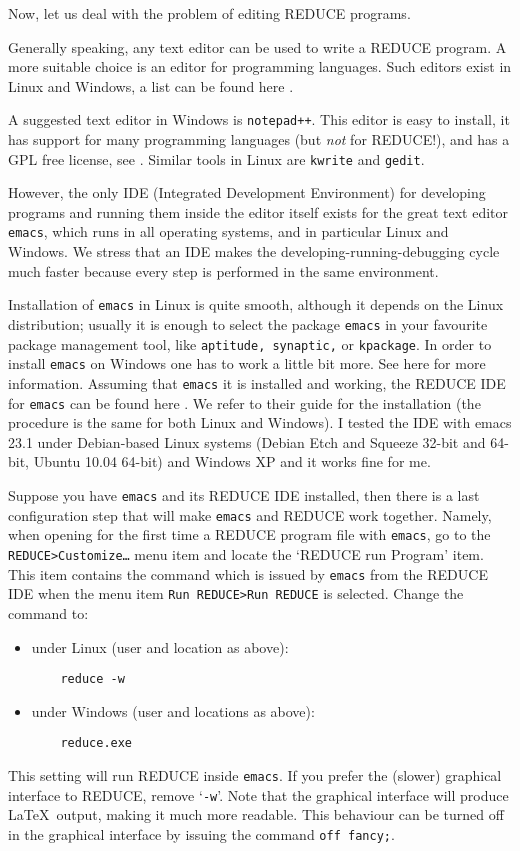 \documentclass[12pt]{amsart}
\theoremstyle{definition}
\newcommand{\reduce}{REDUCE\xspace}
\begin{document}
Now, let us deal with the problem of editing \reduce programs.

Generally speaking, any text editor can be used to write a \reduce program. A
more suitable choice is an editor for programming languages. Such editors exist
in Linux and Windows, a list can be found here \cite{ed}.

A suggested text editor in Windows is \texttt{notepad++}. This editor is easy
to install, it has support for many programming languages (but \emph{not} for
\reduce!), and has a GPL free license, see \cite{noteppp}. Similar tools in
Linux are \texttt{kwrite} and \texttt{gedit}.

However, the only IDE (Integrated Development Environment) for developing
programs and running them inside the editor itself exists for the great text
editor \texttt{emacs}, which runs in all operating systems, and in particular
Linux and Windows. We stress that an IDE makes the developing-running-debugging
cycle much faster because every step is performed in the same environment.

Installation of \texttt{emacs} in Linux is quite smooth, although it depends on
the Linux distribution; usually it is enough to select the package
\texttt{emacs} in your favourite package management tool, like
\texttt{aptitude, synaptic,} or \texttt{kpackage}.  In order to install
\texttt{emacs} on Windows one has to work a little bit more. See here
\cite{emacswin} for more information.  Assuming that \texttt{emacs} it is
installed and working, the \reduce IDE for \texttt{emacs} can be found here
\cite{redide}.  We refer to their guide for the installation (the procedure is
the same for both Linux and Windows). I tested the IDE with emacs 23.1 under
Debian-based Linux systems (Debian Etch and Squeeze 32-bit and 64-bit, Ubuntu
10.04 64-bit) and Windows XP and it works fine for me.

Suppose you have \texttt{emacs} and its \reduce IDE installed, then there is a
last configuration step that will make \texttt{emacs} and \reduce work together.
Namely, when opening for the first time a \reduce program file with
\texttt{emacs}, go to the \texttt{REDUCE>Customize\dots} menu item and locate
the `\reduce run Program' item. This item contains the command which is issued
by \texttt{emacs} from the \reduce IDE when the menu item \texttt{Run REDUCE>Run
  REDUCE} is selected. Change the command to:
  \begin{itemize}
  \item under Linux (user and location as above):
   \begin{verbatim}
    reduce -w
    \end{verbatim}
  \item under Windows (user and locations as above):
   \begin{verbatim}
    reduce.exe
    \end{verbatim}
  \end{itemize}
This setting will run \reduce inside \texttt{emacs}. If you prefer the (slower)
graphical interface to \reduce, remove `\texttt{-w}'. Note that the graphical
interface will produce \LaTeX\ output, making it much more readable. This
behaviour can be turned off in the graphical interface by issuing the command
\texttt{off fancy;}.
\end{document}
